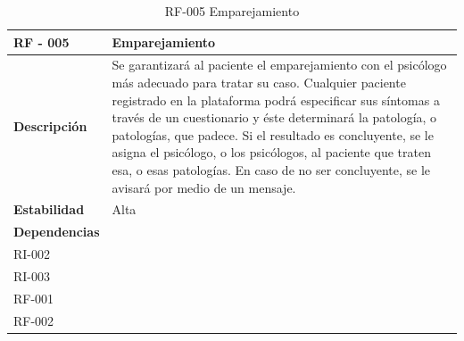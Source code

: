 \begin{table}[htpb]
\centering
\begin{tabularx}{\textwidth}{|l|X|}
\hline
\textbf{RF - 005}                               & \textbf{Emparejamiento                                                                                                                                                                                                                                                                    } \\ \hline
\textbf{Descripción}                             & Se garantizará al paciente el emparejamiento con el psicólogo más adecuado para tratar su caso. Cualquier paciente registrado en la plataforma podrá especificar sus síntomas a través de un cuestionario y éste determinará la patología, o patologías, que padece. Si el resultado es concluyente, se le asigna el psicólogo, o los psicólogos, al paciente que traten esa, o esas patologías. En caso de no ser concluyente, se le avisará por medio de un mensaje. \\ \hline
\textbf{Estabilidad}                             & Alta                                                                                                                                                                                                                                                                               \\ \hline
\textbf{Dependencias} & \begin{tabular}[c]{@{}l@{}}RI-001\\ RI-002\\ RI-003\\ RF-001\\ RF-002\end{tabular}                                                                                                                                                                                                 \\ \hline
\end{tabularx}
\caption{RF-005 Emparejamiento}
\end{table}

